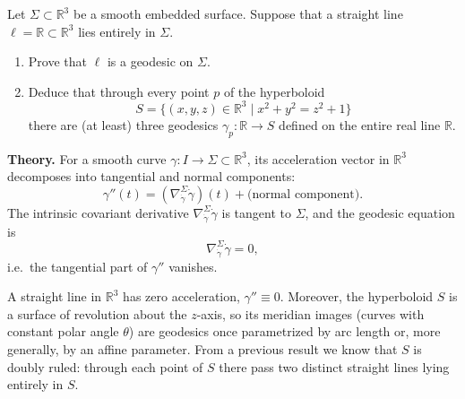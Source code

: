 \begin{problem}
\label{prob:cp-vii-0067}
Let $\Sigma\subset\mathbb R^3$ be a smooth embedded surface.
	Suppose that a straight line $\ell=\mathbb R\subset\mathbb R^3$ lies entirely
	in $\Sigma$.
	\begin{enumerate}
		\item Prove that $\ell$ is a geodesic on $\Sigma$.
		\item Deduce that through every point $p$ of the hyperboloid
		\[
		S = \{(x,y,z)\in\mathbb R^3 \mid x^2 + y^2 = z^2 + 1\}
		\]
		there are (at least) three geodesics $\gamma_p:\mathbb R\to S$
		defined on the entire real line $\mathbb R$.
	\end{enumerate}
	
	\medskip
	\textbf{Theory.}
	For a smooth curve $\gamma:I\to\Sigma\subset\mathbb R^3$, its acceleration
	vector in $\mathbb R^3$ decomposes into tangential and normal components:
	\[
	\gamma''(t) = (\nabla^{\Sigma}_{\dot\gamma}\dot\gamma)(t) + \text{(normal component)}.
	\]
	The intrinsic covariant derivative $\nabla^{\Sigma}_{\dot\gamma}\dot\gamma$
	is tangent to $\Sigma$, and the geodesic equation is
	\[
	\nabla^{\Sigma}_{\dot\gamma}\dot\gamma=0,
	\]
	i.e.\ the tangential part of $\gamma''$ vanishes.
	
	A straight line in $\mathbb R^3$ has zero acceleration, $\gamma''\equiv0$.
	Moreover, the hyperboloid $S$ is a surface of revolution about the $z$-axis, so
	its meridian images (curves with constant polar angle $\theta$) are geodesics
	once parametrized by arc length or, more generally, by an affine parameter.
	From a previous result we know that $S$ is doubly ruled: through each point of
	$S$ there pass two distinct straight lines lying entirely in $S$.
	
	\medskip
\end{problem}

